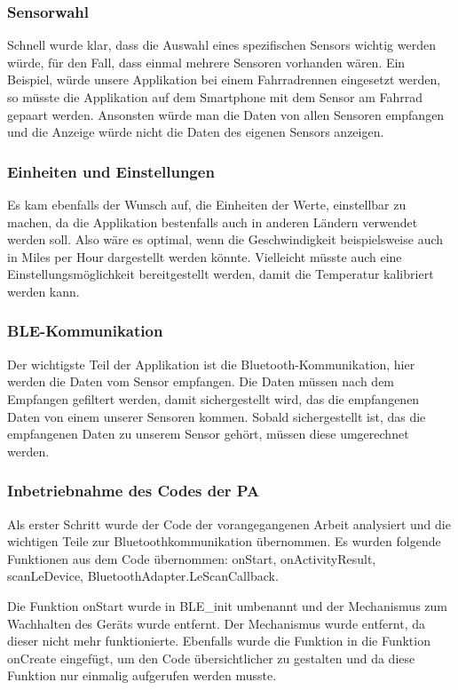\subsubsection{Sensorwahl}

Schnell wurde klar, dass die Auswahl eines spezifischen Sensors wichtig werden würde, für den Fall, dass einmal mehrere Sensoren vorhanden wären. Ein Beispiel, würde unsere Applikation bei einem Fahrradrennen eingesetzt werden, so müsste die Applikation auf dem Smartphone mit dem Sensor am Fahrrad gepaart werden. Ansonsten würde man die Daten von allen Sensoren empfangen und die Anzeige würde nicht die Daten des eigenen Sensors anzeigen.

\subsubsection{Einheiten und Einstellungen}

Es kam ebenfalls der Wunsch auf, die Einheiten der Werte, einstellbar zu machen, da die Applikation bestenfalls auch in anderen Ländern verwendet werden soll. Also wäre es optimal, wenn die Geschwindigkeit beispielsweise auch in Miles per Hour dargestellt werden könnte. Vielleicht müsste auch eine Einstellungsmöglichkeit bereitgestellt werden, damit die Temperatur kalibriert werden kann.

\subsubsection{BLE-Kommunikation}

Der wichtigste Teil der Applikation ist die Bluetooth-Kommunikation, hier werden die Daten vom Sensor empfangen. Die Daten müssen nach dem Empfangen gefiltert werden, damit sichergestellt wird, das die empfangenen Daten von einem unserer Sensoren kommen. Sobald sichergestellt ist, das die empfangenen Daten zu unserem Sensor gehört, müssen diese umgerechnet werden.

\subsubsection{Inbetriebnahme des Codes der PA}

Als erster Schritt wurde der Code der vorangegangenen Arbeit analysiert und die wichtigen Teile zur Bluetoothkommunikation übernommen. Es wurden folgende Funktionen aus dem Code übernommen: onStart, onActivityResult, scanLeDevice, BluetoothAdapter.LeScanCallback.

Die Funktion onStart wurde in BLE\_init umbenannt und der Mechanismus zum Wachhalten des Geräts wurde entfernt. Der Mechanismus wurde entfernt, da dieser nicht mehr funktionierte. Ebenfalls wurde die Funktion in die Funktion onCreate eingefügt, um den Code übersichtlicher zu gestalten und da diese Funktion nur einmalig aufgerufen werden musste.
 
